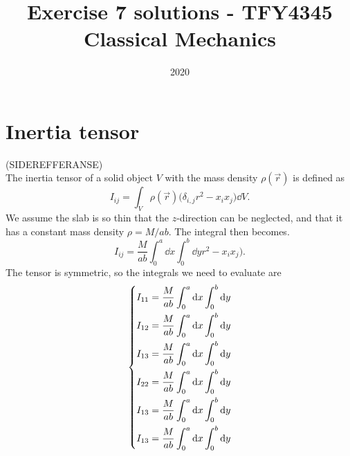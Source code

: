 \documentclass{article}
\title{Exercise 7 solutions - TFY4345 Classical Mechanics}
\date{2020}
\begin{document}
    \maketitle
    \section{Inertia tensor}
    (SIDEREFFERANSE)\\
    The inertia tensor of a solid object $V$ with the mass density $\rho(\vec r)$ is defined as
    \begin{equation}
        I_{ij} = \int_V \rho(\vec{r}) \big(\delta_{i, j} r^2 - x_ix_j) \dd V.
    \end{equation}
    We assume the slab is so thin that the $z$-direction can be neglected, and that it has a constant mass density $\rho = M / ab$. The integral then becomes.
    \begin{equation}
        I_{ij} = \frac{M}{ab} \int_0^a \dd x \int_0^b \dd y r^2 - x_ix_j).
    \end{equation}
    The tensor is symmetric, so the integrals we need to evaluate are
    \begin{equation}
        \begin{dcases}
            I_{1 1} = \frac{M}{ab} \int_0^a \dd x \int_0^b \dd y \\
            I_{1 2} = \frac{M}{ab} \int_0^a \dd x \int_0^b \dd y \\
            I_{1 3} = \frac{M}{ab} \int_0^a \dd x \int_0^b \dd y \\
            I_{2 2} = \frac{M}{ab} \int_0^a \dd x \int_0^b \dd y \\
            I_{1 3} = \frac{M}{ab} \int_0^a \dd x \int_0^b \dd y \\
            I_{1 3} = \frac{M}{ab} \int_0^a \dd x \int_0^b \dd y \\
        \end{dcases}    
    \end{equation}
\end{document}
